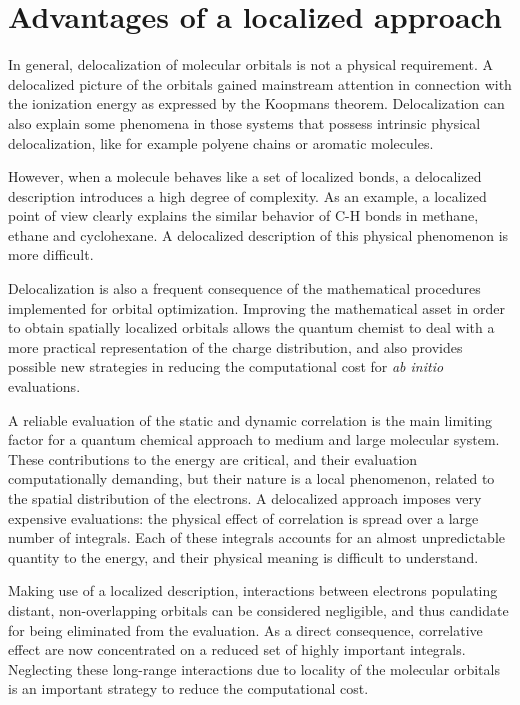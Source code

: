 \section{Advantages of a localized approach}

In general, delocalization of molecular orbitals is not a physical
requirement. A delocalized picture of the orbitals gained mainstream
attention in connection with the ionization energy as expressed by the
Koopmans theorem. Delocalization can also explain some phenomena in those
systems that possess intrinsic physical delocalization, like for example
polyene chains or aromatic molecules.

However, when a molecule behaves like a set of localized bonds, a
delocalized description introduces a high degree of complexity. As an
example, a localized point of view clearly explains the similar behavior
of C-H bonds in methane, ethane and cyclohexane. A delocalized description
of this physical phenomenon is more difficult.

Delocalization is also a frequent consequence of the mathematical procedures
implemented for orbital optimization. Improving the mathematical asset in
order to obtain spatially localized orbitals allows the quantum chemist to
deal with a more practical representation of the charge distribution, and 
also provides possible new strategies in reducing the computational cost
for \textit{ab initio} evaluations.

A reliable evaluation of the static and dynamic correlation is the main 
limiting factor for a quantum chemical approach to medium and large
molecular system. These contributions to the energy are critical, and their
evaluation computationally demanding, but their nature is a local
phenomenon, related to the spatial distribution of the electrons. A
delocalized approach imposes very expensive evaluations: the physical effect
of correlation is spread over a large number of integrals. Each of these
integrals accounts for an almost unpredictable quantity to the energy, and
their physical meaning is difficult to understand.

Making use of a localized description, interactions between electrons
populating distant, non-overlapping orbitals can be considered negligible, and
thus candidate for being eliminated from the evaluation. As a direct
consequence, correlative effect are now concentrated on a reduced set of
highly important integrals. Neglecting these long-range interactions due to
locality of the molecular orbitals is an important strategy to reduce the
computational cost.

